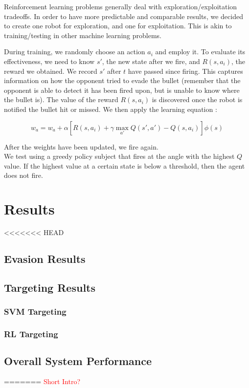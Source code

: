 \documentclass{article}
\newcommand{\xxx}[1]{\textcolor{red}{#1}}
\theoremstyle{plain}
\theoremstyle{definition}
\theoremstyle{remark}
\begin{document}
Reinforcement learning problems generally deal with exploration/exploitation tradeoffs. In order to have more predictable and comparable results, we decided to
create one robot for exploration, and one for exploitation. This is akin to training/testing in other machine learning problems.

During training, we randomly choose an action $a_i$ and employ it. To evaluate its effectiveness, we need to know $s'$, the new state after we fire,
and $R(s, a_i)$, the reward we obtained. We record $s'$ after $t$ have passed since firing. This captures information on
how the opponent tried to evade the bullet (remember that the opponent is able to detect it has been fired upon, but is unable to know where the bullet is).
The value of the reward $R(s, a_i)$ is discovered once the robot is notified the bullet hit or missed. We then apply the learning equation \cite{russelnorvig}:

$$w_a = w_a + \alpha\left[R(s, a_i) + \gamma\max_{a'}Q(s', a') - Q(s, a_i)\right]\phi(s)$$

After the weights have been updated, we fire again.\\

We test using a greedy policy subject that fires at the angle with the highest $Q$ value. If the highest value at a certain state is below a threshold, then
the agent does not fire.

\section{Results}
<<<<<<< HEAD
\subsection*{Evasion Results}

\subsection*{Targeting Results}

\subsubsection*{SVM Targeting}

\subsubsection*{RL Targeting}

\subsection*{Overall System Performance}
=======
\xxx{Short Intro?}
\end{document}
